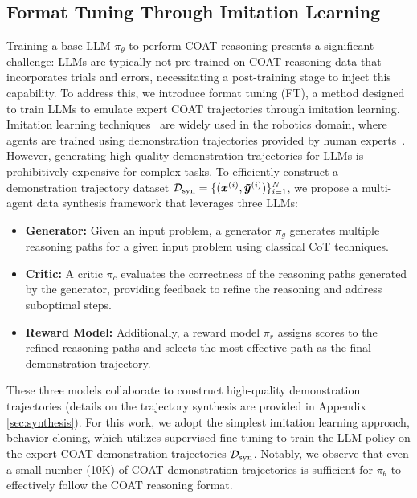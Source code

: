 \subsection{Format Tuning Through Imitation Learning} \label{subsec:format}
Training a base LLM $\pi_{\theta}$ to perform COAT reasoning presents a significant challenge: LLMs are typically not pre-trained on COAT reasoning data that incorporates trials and errors, necessitating a post-training stage to inject this capability. To address this, we introduce format tuning (FT), a method designed to train LLMs to emulate expert COAT trajectories through imitation learning. Imitation learning techniques~\cite{hussein2017imitation} are widely used in the robotics domain, where agents are trained using demonstration trajectories provided by human experts~\cite{ross2010efficient, ross2011reduction, ho2016generative}. However, generating high-quality demonstration trajectories for LLMs is prohibitively expensive for complex tasks. To efficiently construct a demonstration trajectory dataset $\mathcal{D}_{\text{syn}}=\{(\boldsymbol{x}^{(i)},\boldsymbol{\Tilde{y}}^{(i)})\}_{i=1}^N$, we propose a multi-agent data synthesis framework that leverages three LLMs:
\begin{itemize}[left=0.05cm]
    \item \textbf{Generator:} Given an input problem, a generator $\pi_g$ generates multiple reasoning paths for a given input problem using classical CoT techniques.
    \item \textbf{Critic:} A critic $\pi_c$ evaluates the correctness of the reasoning paths generated by the generator, providing feedback to refine the reasoning and address suboptimal steps.
    \item \textbf{Reward Model:} Additionally, a reward model $\pi_r$ assigns scores to the refined reasoning paths and selects the most effective path as the final demonstration trajectory. 
\end{itemize}
These three models collaborate to construct high-quality demonstration trajectories (details on the trajectory synthesis are provided in Appendix \ref{sec:synthesis}). For this work, we adopt the simplest imitation learning approach, behavior cloning, which utilizes supervised fine-tuning to train the LLM policy on the expert COAT demonstration trajectories $\mathcal{D}_{\text{syn}}$. Notably, we observe that even a small number (10K) of COAT demonstration trajectories is sufficient for $\pi_{\theta}$ to effectively follow the COAT reasoning format.



